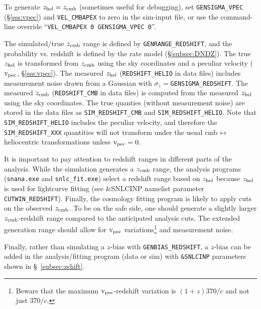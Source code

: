 \documentclass[12pt]{article}
\newcommand{\zhelio}{z_{\rm hel}}
\newcommand{\zcmb}{z_{\rm cmb}}
\newcommand{\vpec}{{\rm v}_{\rm pec}}
\begin{document}
To generate $\zhelio=\zcmb$ (sometimes useful for debugging), 
set {\tt GENSIGMA\_VPEC} (\S\ref{sss:vpec}) and  {\tt VEL\_CMBAPEX} 
to zero in the sim-input file, or use the command-line override 
``{\tt VEL\_CMBAPEX 0  GENSIGMA\_VPEC 0}''.


The simulated/true $\zcmb$ range is defined by {\tt GENRANGE\_REDSHIFT},
and the probability vs. redshift is defined by the rate model
(\S\ref{subsec:DNDZ}).
The true $\zhelio$ is transformed from $\zcmb$ using the sky coordinates 
and a peculiar velocity ($\vpec$, \S\ref{sss:vpec}).
The measured $\zhelio$ ({\tt REDSHIFT\_HELIO} in data files) 
includes measurement noise drawn from a 
Gaussian with $\sigma_z=${\tt GENSIGMA\_REDSHIFT}.
The measured $\zcmb$ ({\tt REDSHIFT\_CMB} in data files) 
is computed from the measured $\zhelio$
using the sky coordinates.
The true quanties (without measurement noise)
are stored in the data files as
{\tt SIM\_REDSHIFT\_CMB} and {\tt SIM\_REDSHIFT\_HELIO}.
Note that {\tt SIM\_REDSHIFT\_HELIO} includes the
peculiar velocity, and therefore the {\tt SIM\_REDSHIFT\_XXX}
quantities will not transform under the usual 
cmb$\leftrightarrow$heliocentric transformations
unless $\vpec=0$.

It is important to pay attention to redshift ranges in 
different parts of the analysis. While the simulation
generates a $\zcmb$ range, the analysis programs
({\tt snana.exe} and {\tt snlc\_fit.exe}) 
select a redshift range based on $\zhelio$ because $\zhelio$
is used for lightcurve fitting
(see \&SNLCINP namelist parameter {\tt CUTWIN\_REDSHIFT}).
Finally, the cosmology fitting program is likely to
apply cuts on the observed $\zcmb$.
To be on the safe side, one should generate a slightly larger
$\zcmb$-redshift range compared to the anticipated 
analysis cuts. The extended generation range should allow
for $\vpec$ variations\footnote{Beware that the maximum 
$\vpec$-redshift variation is $(1+z) 370/c$ and 
not just $370/c$.}  %
and measurement noise. 

Finally, rather than simulating a $z$-bias with {\tt GENBIAS\_REDSHIFT},
a $z$-bias can be added in the analysis/fitting program 
(data or sim) with 
{\tt \&SNLCINP} parameters shown in \S~\ref{subsec:zshift}.
\end{document}
